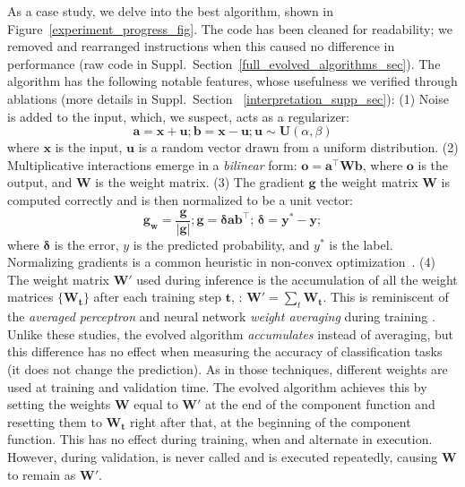 As a case study, we delve into the best algorithm, shown in Figure~\ref{experiment_progress_fig}. The code has been cleaned for readability; we removed and rearranged instructions when this caused no difference in performance (raw code in Suppl.\  Section~\ref{full_evolved_algorithms_sec}). The algorithm has the following notable features, whose usefulness we verified through ablations (more details in Suppl.\ Section ~\ref{interpretation_supp_sec}):
(1) Noise is added to the input, which, we suspect, acts as a regularizer: 
\begin{equation*}
\mathbf{a} = \mathbf{x} + \mathbf{u}; \mathbf{b} = \mathbf{x} - \mathbf{u}; \mathbf{u} \sim \mathbf{U}(\alpha, \beta)
\end{equation*}
where $\mathbf{x}$ is the input, $\mathbf{u}$ is a random vector drawn from a uniform distribution. 
(2) Multiplicative interactions \cite{jayakumar2020multiplicative} emerge in a \emph{bilinear} form:
$\mathbf{o} = \mathbf{a}^\intercal \mathbf{W} \mathbf{b}$, 
where $\mathbf{o}$ is the output, and $\mathbf{W}$ is the weight matrix.
(3) The gradient $\mathbf{g}$ \wrt the weight matrix $\mathbf{W}$ is computed correctly and is then normalized to be a unit vector:
\begin{equation*}
    \mathbf{g_w} = \frac{\mathbf{g}}{|\mathbf{g}|}; \mathbf{g} = \mathbf{\delta} \mathbf{a} \mathbf{b}^\intercal; \, \mathbf{\delta} = \mathbf{y^*} -  \mathbf{y}; 
\end{equation*}
where $\mathbf{\delta}$ is the error, $y$ is the predicted probability, and $y^*$ is the label. Normalizing gradients is a common heuristic in non-convex optimization~\cite{hazan2015beyond,levy2016power}.
(4) The weight matrix $\mathbf{W'}$ used during inference is the accumulation of all the weight matrices $\{\mathbf{W_t}\}$ after each training step $\mathbf{t}$, \ie: $\mathbf{W'} = \sum_t \mathbf{W_t}$.
This is reminiscent of the \emph{averaged perceptron} \cite{collins2002discriminative} and neural network \emph{weight averaging} during training \cite{polyak1992acceleration,goodfellow2016deep}. Unlike these studies, the evolved algorithm \emph{accumulates} instead of averaging, but this difference has no effect when measuring the accuracy of classification tasks (it does not change the prediction).
As in those techniques, different weights are used at training and validation time. The evolved algorithm achieves this by setting the weights $\mathbf{W}$ equal to $\mathbf{W'}$ at the end of the \predict component function and resetting them to $\mathbf{W_t}$ right after that, at the beginning of the \learn component function. This has no effect during training, when \predict and \learn alternate in execution. However, during validation, \learn is never called and \predict is executed repeatedly, causing $\mathbf{W}$ to remain as $\mathbf{W'}$.

